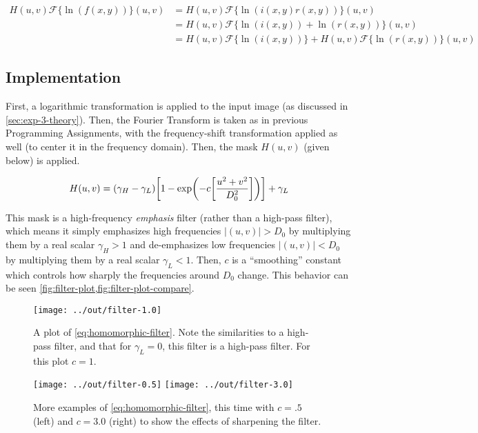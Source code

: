 \documentclass[headings=optiontoheadandtoc,listof=totoc,parskip=full]{scrartcl}
\begin{document}
\begin{equation}
	\begin{aligned}
		H(u,v)\mathcal{F}\{\ln(f(x,y))\}(u,v) &= H(u,v)\mathcal{F}\{\ln(i(x,y)r(x,y))\}(u,v)\\
			&= H(u,v)\mathcal{F}\{\ln(i(x,y)) + \ln(r(x,y))\}(u,v)\\
			&= H(u,v)\mathcal{F}\{\ln(i(x,y))\} + H(u,v)\mathcal{F}\{\ln(r(x,y))\}(u,v)
	\end{aligned}
	\label{eq:homo}
\end{equation}

\subsection{Implementation}

First, a logarithmic transformation is applied to the input image (as discussed in \cref{sec:exp-3-theory}). Then, the Fourier Transform is taken as in previous Programming Assignments, with the frequency-shift transformation applied as well (to center it in the frequency domain). Then, the mask $H(u,v)$ (given below) is applied.

\begin{equation}
	H(u,v) = (\gamma_H - \gamma_L) \qty[1 - \exp(-c \qty[\frac{u^2 + v^2}{D_0^2}])] + \gamma_L
	\label{eq:homomorphic-filter}
\end{equation}

This mask is a high-frequency \emph{emphasis} filter (rather than a high-pass filter), which means it simply emphasizes high frequencies $|(u, v)| > D_0$ by multiplying them by a real scalar $\gamma_H > 1$ and de-emphasizes low frequencies $|(u, v)| < D_0$ by multiplying them by a real scalar $\gamma_L < 1$. Then, $c$ is a ``smoothing'' constant which controls how sharply the frequencies around $D_0$ change. This behavior can be seen \cref{fig:filter-plot,fig:filter-plot-compare}.

\begin{figure}[H]
	\centering
	\texttt{[image: ../out/filter-1.0]}
	\caption{A plot of \cref{eq:homomorphic-filter}. Note the similarities to a high-pass filter, and that for $\gamma_L = 0$, this filter is a high-pass filter. For this plot $c = 1$.}
	\label{fig:filter-plot}
\end{figure}

\begin{figure}[H]
	\centering
	\texttt{[image: ../out/filter-0.5]}
	\texttt{[image: ../out/filter-3.0]}
	\caption{More examples of \cref{eq:homomorphic-filter}, this time with $c = .5$ (left) and $c = 3.0$ (right) to show the effects of sharpening the filter.}
	\label{fig:filter-plot-compare}
\end{figure}
\end{document}

